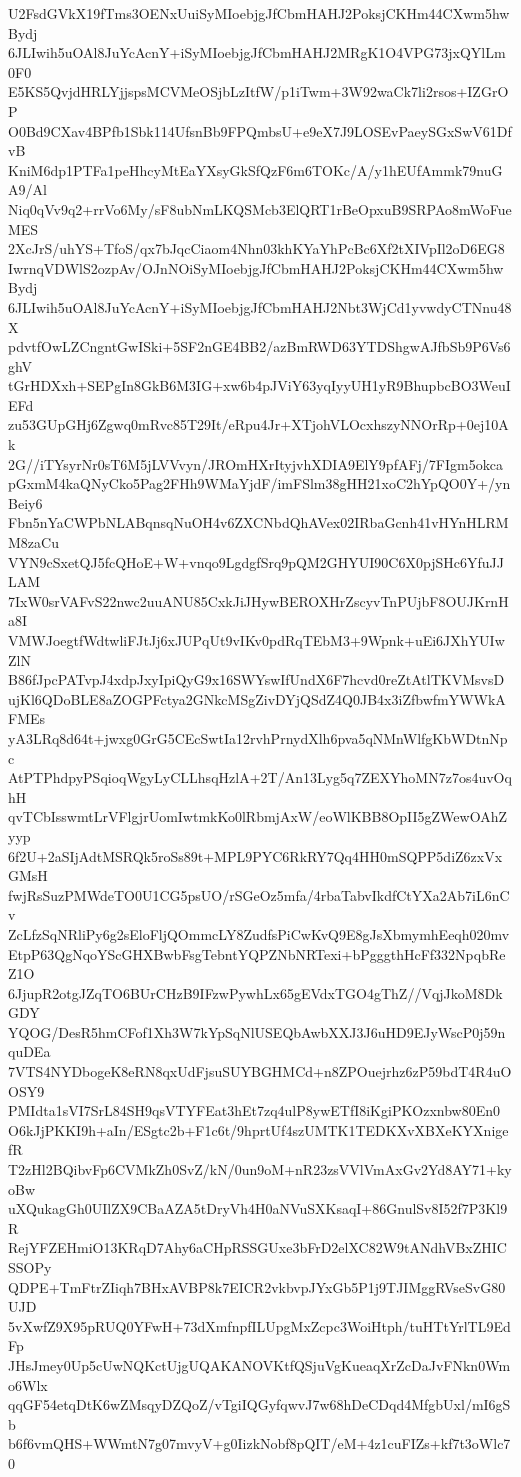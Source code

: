 U2FsdGVkX19fTms3OENxUuiSyMIoebjgJfCbmHAHJ2PoksjCKHm44CXwm5hwBydj
6JLIwih5uOAl8JuYcAcnY+iSyMIoebjgJfCbmHAHJ2MRgK1O4VPG73jxQYlLm0F0
E5KS5QvjdHRLYjjspsMCVMeOSjbLzItfW/p1iTwm+3W92waCk7li2rsos+IZGrOP
O0Bd9CXav4BPfb1Sbk114UfsnBb9FPQmbsU+e9eX7J9LOSEvPaeySGxSwV61DfvB
KniM6dp1PTFa1peHhcyMtEaYXsyGkSfQzF6m6TOKc/A/y1hEUfAmmk79nuGA9/Al
Niq0qVv9q2+rrVo6My/sF8ubNmLKQSMcb3ElQRT1rBeOpxuB9SRPAo8mWoFueMES
2XcJrS/uhYS+TfoS/qx7bJqcCiaom4Nhn03khKYaYhPcBc6Xf2tXIVpIl2oD6EG8
IwrnqVDWlS2ozpAv/OJnNOiSyMIoebjgJfCbmHAHJ2PoksjCKHm44CXwm5hwBydj
6JLIwih5uOAl8JuYcAcnY+iSyMIoebjgJfCbmHAHJ2Nbt3WjCd1yvwdyCTNnu48X
pdvtfOwLZCngntGwISki+5SF2nGE4BB2/azBmRWD63YTDShgwAJfbSb9P6Vs6ghV
tGrHDXxh+SEPgIn8GkB6M3IG+xw6b4pJViY63yqIyyUH1yR9BhupbcBO3WeuIEFd
zu53GUpGHj6Zgwq0mRvc85T29It/eRpu4Jr+XTjohVLOcxhszyNNOrRp+0ej10Ak
2G//iTYsyrNr0sT6M5jLVVvyn/JROmHXrItyjvhXDIA9ElY9pfAFj/7FIgm5okca
pGxmM4kaQNyCko5Pag2FHh9WMaYjdF/imFSlm38gHH21xoC2hYpQO0Y+/ynBeiy6
Fbn5nYaCWPbNLABqnsqNuOH4v6ZXCNbdQhAVex02IRbaGcnh41vHYnHLRMM8zaCu
VYN9cSxetQJ5fcQHoE+W+vnqo9LgdgfSrq9pQM2GHYUI90C6X0pjSHc6YfuJJLAM
7IxW0srVAFvS22nwc2uuANU85CxkJiJHywBEROXHrZscyvTnPUjbF8OUJKrnHa8I
VMWJoegtfWdtwliFJtJj6xJUPqUt9vIKv0pdRqTEbM3+9Wpnk+uEi6JXhYUIwZlN
B86fJpcPATvpJ4xdpJxyIpiQyG9x16SWYswIfUndX6F7hcvd0reZtAtlTKVMsvsD
ujKl6QDoBLE8aZOGPFctya2GNkcMSgZivDYjQSdZ4Q0JB4x3iZfbwfmYWWkAFMEs
yA3LRq8d64t+jwxg0GrG5CEcSwtIa12rvhPrnydXlh6pva5qNMnWlfgKbWDtnNpc
AtPTPhdpyPSqioqWgyLyCLLhsqHzlA+2T/An13Lyg5q7ZEXYhoMN7z7os4uvOqhH
qvTCbIsswmtLrVFlgjrUomIwtmkKo0lRbmjAxW/eoWlKBB8OpII5gZWewOAhZyyp
6f2U+2aSIjAdtMSRQk5roSs89t+MPL9PYC6RkRY7Qq4HH0mSQPP5diZ6zxVxGMsH
fwjRsSuzPMWdeTO0U1CG5psUO/rSGeOz5mfa/4rbaTabvIkdfCtYXa2Ab7iL6nCv
ZcLfzSqNRliPy6g2sEloFljQOmmcLY8ZudfsPiCwKvQ9E8gJsXbmymhEeqh020mv
EtpP63QgNqoYScGHXBwbFsgTebntYQPZNbNRTexi+bPgggthHcFf332NpqbReZ1O
6JjupR2otgJZqTO6BUrCHzB9IFzwPywhLx65gEVdxTGO4gThZ//VqjJkoM8DkGDY
YQOG/DesR5hmCFof1Xh3W7kYpSqNlUSEQbAwbXXJ3J6uHD9EJyWscP0j59nquDEa
7VTS4NYDbogeK8eRN8qxUdFjsuSUYBGHMCd+n8ZPOuejrhz6zP59bdT4R4uOOSY9
PMIdta1sVI7SrL84SH9qsVTYFEat3hEt7zq4ulP8ywETfI8iKgiPKOzxnbw80En0
O6kJjPKKI9h+aIn/ESgtc2b+F1c6t/9hprtUf4szUMTK1TEDKXvXBXeKYXnigefR
T2zHl2BQibvFp6CVMkZh0SvZ/kN/0un9oM+nR23zsVVlVmAxGv2Yd8AY71+kyoBw
uXQukagGh0UIlZX9CBaAZA5tDryVh4H0aNVuSXKsaqI+86GnulSv8I52f7P3Kl9R
RejYFZEHmiO13KRqD7Ahy6aCHpRSSGUxe3bFrD2elXC82W9tANdhVBxZHICSSOPy
QDPE+TmFtrZIiqh7BHxAVBP8k7EICR2vkbvpJYxGb5P1j9TJIMggRVseSvG80UJD
5vXwfZ9X95pRUQ0YFwH+73dXmfnpfILUpgMxZcpc3WoiHtph/tuHTtYrlTL9EdFp
JHsJmey0Up5cUwNQKctUjgUQAKANOVKtfQSjuVgKueaqXrZcDaJvFNkn0Wmo6Wlx
qqGF54etqDtK6wZMsqyDZQoZ/vTgiIQGyfqwvJ7w68hDeCDqd4MfgbUxl/mI6gSb
b6f6vmQHS+WWmtN7g07mvyV+g0IizkNobf8pQIT/eM+4z1cuFIZs+kf7t3oWlc70
